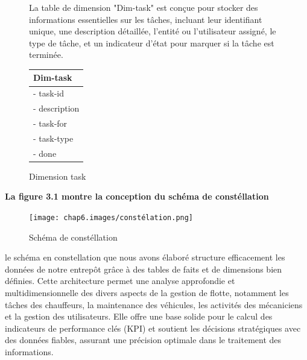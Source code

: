 \begin{figure}[htbp]
    \centering
    \begin{minipage}{0.60\textwidth}



        La table de dimension "Dim-task" est conçue pour stocker des informations essentielles sur les tâches, incluant leur identifiant unique, une description détaillée, l'entité ou l'utilisateur assigné, le type de tâche, et un indicateur d'état pour marquer si la tâche est terminée.

    \end{minipage}
    \hfill
    \begin{minipage}{0.38\textwidth}

        \renewcommand{\arraystretch}{1.7}
        \centering
        \begin{tabular}{|p{4cm}|}
            \hline
            \textbf{Dim-task} \\
            \hline
            - task-id         \\

            - description     \\

            - task-for        \\

            - task-type       \\

            - done            \\

            \hline
        \end{tabular}

        \caption{Dimension task}

    \end{minipage}
\end{figure}


\newpage
\large\textbf{La figure 3.1 montre la conception du schéma de constéllation}


\begin{figure}[h!]
    \centering
    \texttt{[image: chap6.images/constélation.png]}
    \caption{ Schéma de constéllation}

\end{figure}




le schéma en constellation que nous avons élaboré structure efficacement les données de notre entrepôt grâce à des tables de faits et de dimensions bien définies. Cette architecture permet une analyse approfondie et multidimensionnelle des divers aspects de la gestion de flotte, notamment les tâches des chauffeurs, la maintenance des véhicules, les activités des mécaniciens et la gestion des utilisateurs. Elle offre une base solide pour le calcul des indicateurs de performance clés (KPI) et soutient les décisions stratégiques avec des données fiables, assurant une précision optimale dans le traitement des informations.\\

